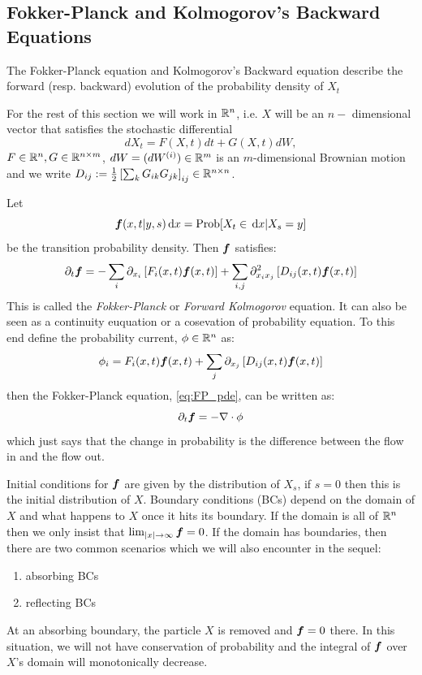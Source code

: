 \documentclass{article}
\begin{document}
\subsection{Fokker-Planck and Kolmogorov's Backward Equations}
The Fokker-Planck equation and Kolmogorov's Backward equation describe the
forward (resp. backward)  evolution of the probability density of $X_t$

For the rest of this section we will work in $ { \mathbb{R} }^n$, i.e. $X$ will be an $n-$
dimensional vector that satisfies the stochastic differential 
\begin{equation}
dX_t = F(X,t) dt + G(X,t) dW,
\label{eq:generic_Ito_SDE_Rn}
\end{equation}
$F \in { \mathbb{R} }^n, G \in { \mathbb{R} }^{n \times m}$,
$dW = (dW^{(i)}) \in  { \mathbb{R} }^{  m}$ is an $m$-dimensional Brownian motion and we
write $D_{ij} :=
\tfrac{1}{2} 
\left[{\sum_k G_{ik} G_{jk} } \right]_{ij} \in { \mathbb{R} }^{n\times n} $.


Let $$ { \boldsymbol{f} }(x,t| y,s) \, \mathrm{d} x =  \operatorname{Prob}[X_t \in \, \mathrm{d} x | X_s = y] $$ be the
transition probability density. Then ${ \boldsymbol{f} }$ satisfies:
\begin{equation}
{\partial}_t { \boldsymbol{f} }= -\sum_i {\partial}_{x_i} \left[ F_i(x,t) { \boldsymbol{f} }(x,t) \right] 
+ 
\sum_{i,j}  {\partial}^2_{x_i x_j} \left[ D_{ij}(x,t) { \boldsymbol{f} }(x,t) \right]
\label{eq:FP_pde}
\end{equation}
This is called the \emph{Fokker-Planck} or \emph{Forward Kolmogorov} equation.
It can also be seen as a continuity euquation or a cosevation of probability
equation. To this end define the probability current, ${ \phi } \in { \mathbb{R} }^n$ as:
$$
\phi_i =   F_i(x,t) { \boldsymbol{f} }(x,t) 
+ 
\sum_{j}  {\partial}_{x_j} \left[ D_{ij}(x,t) { \boldsymbol{f} }(x,t)\right]
$$
then the Fokker-Planck equation, \cref{eq:FP_pde}, can be written as:
$$
{\partial}_t { \boldsymbol{f} }= -{ \nabla } \cdot \phi
$$
which just says that the change in probability is the
difference between the flow in and the flow out. 

Initial conditions for ${ \boldsymbol{f} }$ are given by the distribution of $X_s$, if $s=0$
then this is the initial distribution of $X$. Boundary conditions (BCs) depend
on the domain of $X$ and what happens to $X$ once it hits its boundary. If the domain
is all of ${ \mathbb{R} }^n$ then we only insist that $\lim_{|x| {\rightarrow} \infty} { \boldsymbol{f} } = 0$. If the
domain has boundaries, then there are two common scenarios which we will also
encounter in the sequel:
\begin{enumerate}  
  \item absorbing BCs
  \item reflecting BCs
\end{enumerate}
At an absorbing boundary, the particle $X$ is removed and ${ \boldsymbol{f} }=0$ there.
In this situation, we will not have conservation of probability and the integral
of ${ \boldsymbol{f} }$ over $X$'s domain will monotonically decrease.
\end{document}
